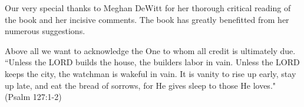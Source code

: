 Our very special thanks to Meghan DeWitt for her thorough critical reading of the book and her incisive comments. The book has greatly benefitted from her numerous suggestions.
\medskip 

Above all we want to acknowledge the One to whom all credit is ultimately due. ``Unless the LORD builds the house, the builders labor in vain. Unless the LORD keeps the city, the watchman is wakeful in vain.  It is vanity to rise up early, stay up late, and eat the bread of sorrows, for He gives sleep to those He loves."  (Psalm 127:1-2)

